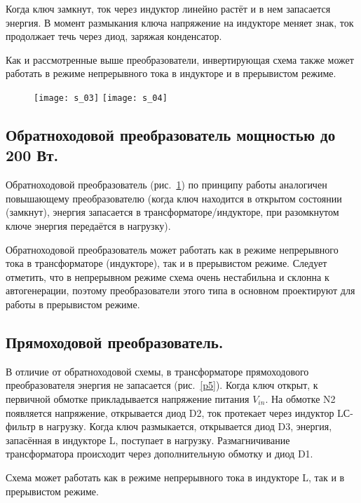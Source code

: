 Когда ключ замкнут, ток через индуктор линейно растёт и в нем запасается
энергия. В момент размыкания ключа напряжение на индукторе меняет знак, ток
продолжает течь через диод, заряжая конденсатор.

Как и рассмотренные выше преобразователи, инвертирующая схема также может
работать в режиме непрерывного тока в индукторе и в прерывистом режиме.

\begin{figure}[ht]
	\texttt{[image: s\_03]} \hfill
	\texttt{[image: s\_04]}
	\parbox{.45\textwidth}{\caption{}\label{p3}} \hfill
	\parbox{.45\textwidth}{\caption{}\label{p4}}
\end{figure}

\subsection{Обратноходовой преобразователь мощностью до 200 Вт.}

Обратноходовой преобразователь (рис.~\ref{p4}) по принципу работы аналогичен
повышающему преобразователю (когда ключ находится в открытом состоянии
(замкнут), энергия запасается в трансформаторе/индукторе, при разомкнутом ключе
энергия передаётся в нагрузку).
	
Обратноходовой преобразователь может работать как в режиме непрерывного тока в
трансформаторе (индукторе), так и в прерывистом режиме. Следует отметить, что в
непрерывном режиме схема очень нестабильна и склонна к автогенерации, поэтому
преобразователи этого типа в основном проектируют для работы в прерывистом
режиме.

\subsection{Прямоходовой преобразователь.}

В отличие от обратноходовой схемы, в трансформаторе прямоходового
преобразователя энергия не запасается (рис.~\ref{p5}). Когда ключ открыт, к
первичной обмотке прикладывается напряжение питания \( V_{in} \). На обмотке N2
появляется напряжение, открывается диод D2, ток протекает через индуктор
LС-фильтр в нагрузку. Когда ключ размыкается, открывается диод D3, энергия,
запасённая в индукторе L, поступает в нагрузку. Размагничивание трансформатора
происходит через дополнительную обмотку и диод D1.

Схема может работать как в режиме непрерывного тока в индукторе L, так и в
прерывистом режиме.

